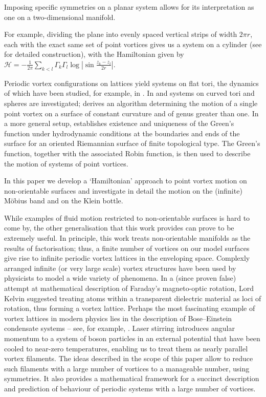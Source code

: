 \documentclass[11pt,twoside]{article}
\theoremstyle{definition}
\numberwithin{equation}{section}
\begin{document}
        
Imposing specific symmetries on a planar system allows for its interpretation as one on a two-dimensional manifold. 
    
    For example, dividing the plane into evenly spaced vertical strips of width $2\pi r$, each with the exact same set of point vortices gives us a system on a cylinder (see \cite{montaldi2003vortex,aref1996motion} for detailed construction), with the Hamiltonian given by $  \mathcal{H} = -\frac{1}{2\pi}\sum_{k<l} \Gamma_k \Gamma_l \log\left|\sin \frac{z_k-z_l}{2r}\right| $. 
    
    Periodic vortex configurations on 
     lattices yield systems on  flat tori, the dynamics of which have  been studied, for example, in \cite{o1989hamiltonian, stremler1999motion}.  In
 \cite{laurent2001point, dritschel2015motion} and \cite{sakajo2016point}  systems on curved tori and spheres are investigated; \cite{ragazzo2017motion} derives an algorithm determining the motion of a single point vortex on a surface of constant curvature and of genus greater than one. In a more general setup, \cite{ragazzo2017hydrodynamic} establishes existence and uniqueness of the Green's function under hydrodynamic conditions at the boundaries  and ends of the surface for an oriented Riemannian surface of finite topological type. The Green's function, together with the associated Robin function, is then used to describe the motion of systems of point vortices. 
   
    
  
 
  
    
   
   In this paper we develop a `Hamiltonian' approach to point vortex motion on non-orientable surfaces and investigate in detail the motion on the (infinite) M\"obius band and on the Klein bottle. 

   While examples of fluid motion restricted to non-orientable surfaces is hard to come by, the other generalisation that this work provides can prove to be extremely useful. In principle, this work treats non-orientable manifolds as the results of factorisation; thus, a finite number of vortices on our model surfaces give rise to infinite periodic vortex lattices in the enveloping space.  
   Complexly arranged infinite (or very large scale) vortex structures have been used by physicists to model a wide variety of phenomena. In a (since proven false) attempt at mathematical description of Faraday's magneto-optic rotation, Lord Kelvin suggested treating atoms within a transparent dielectric material as loci of rotation, thus forming a vortex lattice. Perhaps the most fascinating example of vortex lattices in modern physics lies in the description of Bose–Einstein condensate systems -- see, for example, \cite{newton2009vortex}.  Laser stirring introduces angular momentum to a system of boson particles in an external potential that have been cooled to near-zero temperatures, enabling us to treat them as nearly parallel vortex filaments. 
   The ideas described in the scope of this paper allow to reduce  such filaments with a large number of vortices to a manageable number, using symmetries. It also provides a mathematical framework for a succinct description and prediction of behaviour of periodic systems with a large number of vortices.  
\end{document}
